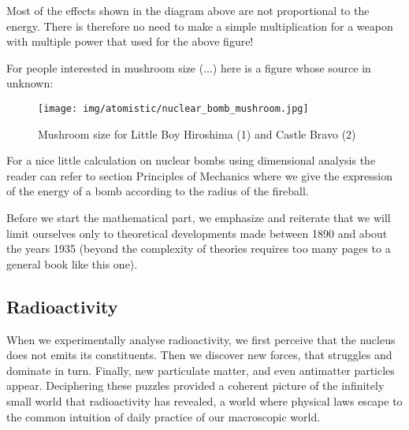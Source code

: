 	Most of the effects shown in the diagram above are not proportional to the energy. There is therefore no need to make a simple multiplication for a weapon with multiple power that used for the above figure!
	
	For people interested in mushroom size (...) here is a figure whose source in unknown:
	\begin{figure}[H]
		\begin{center}
		\texttt{[image: img/atomistic/nuclear\_bomb\_mushroom.jpg]}
		\end{center}	
		\caption{Mushroom size for Little Boy Hiroshima (1) and Castle Bravo (2)}
	\end{figure}
	\begin{tcolorbox}[title=Remark,colframe=black,arc=10pt]
	For a nice little calculation on nuclear bombs using dimensional analysis the reader can refer to section Principles of Mechanics where we give the expression of the energy of a bomb according to the radius of the fireball.
	\end{tcolorbox}
	
	Before we start the mathematical part, we emphasize and reiterate that we will limit ourselves only to theoretical developments made between 1890 and about the years 1935 (beyond the complexity of theories requires too many pages to a general book like this one).
	
	\pagebreak
	\subsection{Radioactivity}
	When we experimentally analyse radioactivity, we first perceive that the nucleus does not emits its constituents. Then we discover new forces, that struggles and dominate in turn. Finally, new particulate matter, and even antimatter particles appear. Deciphering these puzzles provided a coherent picture of the infinitely small world that radioactivity has revealed, a world where physical laws escape to the common intuition of daily practice of our macroscopic world.
	
